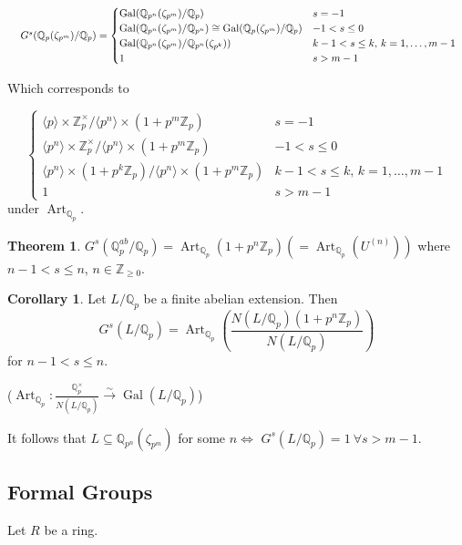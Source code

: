 \documentclass[a4paper]{article}
\theoremstyle{definition}
\theoremstyle{default}
\newtheorem{theorem}[definition]{Theorem}
\newtheorem{corollary}[definition]{Corollary}
\theoremstyle{remark}
\DeclareMathOperator{\Gal}{Gal}
\DeclareMathOperator{\Art}{Art}
\begin{document}
\begin{equation*}
\resizebox{\hsize}{!}{
	$G^s(\mathbb{Q}_p(\zeta_{p^m})/\mathbb{Q}_p) =
\begin{cases}
	\Gal(\mathbb{Q}_{p^n}(\zeta_{p^m})/\mathbb{Q}_p) & s = -1 \\
	\Gal(\mathbb{Q}_{p^n}(\zeta_{p^m})/\mathbb{Q}_{p^n}) \cong \Gal(\mathbb{Q}_p(\zeta_{p^m})/\mathbb{Q}_p) & -1 < s \leq 0 \\
	\Gal(\mathbb{Q}_{p^n}(\zeta_{p^m})/\mathbb{Q}_{p^n}(\zeta_{p^k})) & k-1 < s \leq k,\, k = 1,\dots,m-1 \\
	1 & s > m-1
\end{cases}$}\end{equation*}

Which corresponds to

$$\begin{cases}
	\langle p \rangle \times \mathbb{Z}_p^\times / \langle p^n \rangle \times (1+ p^m \mathbb{Z}_p) & s= -1 \\
	\langle p^n \rangle \times \mathbb{Z}_p^\times / \langle p^n \rangle \times (1+ p^m \mathbb{Z}_p) & -1 < s \leq 0 \\
	\langle p^n \rangle \times (1+p^k \mathbb{Z}_p) / \langle p^n \rangle \times (1+ p^m \mathbb{Z}_p) & k-1 < s \leq k,\, k = 1,\dots,m-1 \\
	1 & s > m-1
\end{cases}$$
under $\Art_{\mathbb{Q}_p}$.

\begin{theorem}
	$G^s(\mathbb{Q}_p^{ab}/\mathbb{Q}_p) = \Art_{\mathbb{Q}_p}(1+p^n \mathbb{Z}_p) \left(= \Art_{\mathbb{Q}_p}(U^{(n)})\right)$
	where $n-1 < s \leq n$, $n \in \mathbb{Z}_{\geq 0}$.
\end{theorem}

\begin{corollary}
	Let $L/\mathbb{Q}_p$ be a finite abelian extension.
	Then $$G^s(L/\mathbb{Q}_p) = \Art_{\mathbb{Q}_p}\left(\frac{N(L/\mathbb{Q}_p)(1+p^n\mathbb{Z}_p)}{N(L/\mathbb{Q}_p)}\right)$$
	for $n-1 < s \leq n$.
	
	($\Art_{\mathbb{Q}_p}: \frac{\mathbb{Q}_p^\times}{N(L/\mathbb{Q}_p)} \overset{\sim}{\longrightarrow} \Gal(L/\mathbb{Q}_p)$)
\end{corollary}

It follows that $L \subseteq \mathbb{Q}_{p^n}(\zeta_{p^m})$ for some $n \iff$ $G^s(L/\mathbb{Q}_p) = 1\ \forall s > m-1$.

\subsection{Formal Groups}
Let $R$ be a ring.
\end{document}

